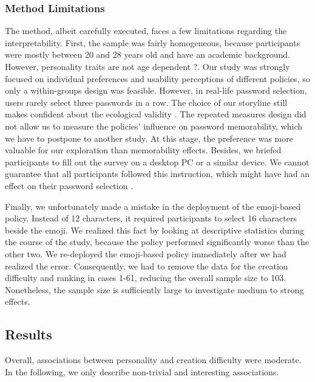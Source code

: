 \subsubsection{Method Limitations}
The method, albeit carefully executed, faces a few limitations regarding the interpretability. First, the sample was fairly homogeneous, because participants were mostly between 20 and 28 years old and have an academic background. However, personality traits are not age dependent \ar?. Our study was strongly focused on individual preferences and usability perceptions of different policies, so only a within-groups design was feasible. However, in real-life password selection, users rarely select three passwords in a row. The choice of our storyline still makes confident about the ecological validity \cite{Fahl2013EcologicalValidityPasswordStudy}. The repeated measures design did not allow us to measure the policies' influence on password memorability, which we have to postpone to another study. At this stage, the preference was more valuable for our exploration than memorability effects. Besides, we briefed participants to fill out the survey on a desktop PC or a similar device. We cannot guarantee that all participants followed this instruction, which might have had an effect on their password selection \cite{Melicher2016UsabilityMobileTextPasswords}. 

Finally, we unfortunately made a mistake in the deployment of the emoji-based policy. Instead of 12 characters, it required participants to select 16 characters beside the emoji. We realized this fact by looking at descriptive statistics during the course of the study, because the policy performed significantly worse than the other two. We re-deployed the emoji-based policy immediately after we had realized the error. Consequently, we had to remove the data for the creation difficulty and ranking in cases 1-61, reducing the overall sample size to 103. Nonetheless, the sample size is sufficiently large to investigate medium to strong effects. 


\subsection{Results}
Overall, associations between personality and creation difficulty were moderate. In the following, we only describe non-trivial and interesting associations. 


